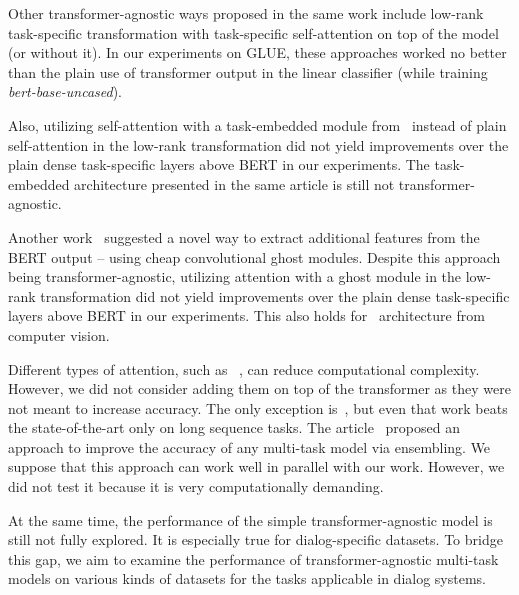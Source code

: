 Other transformer-agnostic ways proposed in the same work include low-rank task-specific transformation with task-specific self-attention on top of the model (or without it). In our experiments on GLUE, these approaches worked no better than the plain use of transformer output in the linear classifier (while training \textit{bert-base-uncased}).

 Also, utilizing self-attention with a task-embedded module from~\cite{TaskEmbedded2021} instead of plain self-attention in the low-rank transformation did not yield improvements over the plain dense task-specific layers above BERT in our experiments. The task-embedded architecture presented in the same article is still not transformer-agnostic.

Another work~\cite{GhostBert2021} suggested a novel way to extract additional features from the BERT output -- using cheap convolutional ghost modules. Despite this approach being transformer-agnostic, utilizing attention with a ghost module in the low-rank transformation did not yield improvements over the plain dense task-specific layers above BERT in our experiments. This also holds for~\cite{el-nouby2021xcit} architecture from computer vision.


Different types of attention, such as ~\cite{reformer}, can reduce computational complexity. However, we did not consider adding them on top of the transformer as they were not meant to increase accuracy. The only exception is~\cite{routing_transformers}, but even that work beats the state-of-the-art only on long sequence tasks.%
The article~\cite{Multi-taskEnsemble:19} proposed an approach to improve the accuracy of any multi-task model via ensembling. We suppose that this approach can work well in parallel with our work. However, we did not test it because it is very computationally demanding.


At the same time, the performance of the simple transformer-agnostic model is still not fully explored. It is especially true for dialog-specific datasets. To bridge this gap, we aim to examine the performance of transformer-agnostic multi-task models on various kinds of datasets for the tasks applicable in dialog systems.
